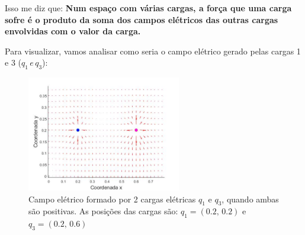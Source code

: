\documentclass[12pt]{extarticle}
\newcommand{\<}{\langle}
\renewcommand{\>}{\rangle}
\theoremstyle{definition}
\begin{document}
Isso me diz que: \textbf{Num espaço com várias cargas, a força que uma carga sofre é o produto da soma dos campos elétricos das outras cargas envolvidas com o valor da carga.}

Para visualizar, vamos analisar como seria o campo elétrico gerado pelas cargas 1 e 3 ($q_1\,e\,q_3$):
\begin{figure}[H]
    \centering
    \includegraphics[width=0.6\textwidth]{multi_charge_system.jpg}
    \caption{Campo elétrico formado por 2 cargas elétricas $q_1$ e $q_3$, quando ambas são positivas. As posições das cargas são: $q_1=(0.2,\,0.2)$ e $q_3=(0.2,\,0.6)$}
    \label{fig:multi_system}
\end{figure}
\end{document}
